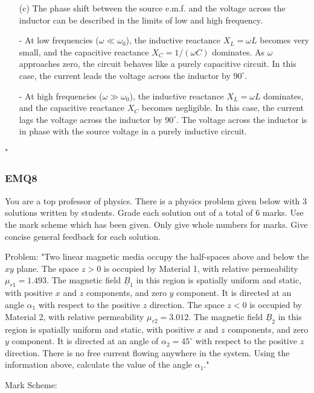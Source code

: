 \begin{enumerate}
    \item[(c)] The phase shift between the source e.m.f. and the voltage across the inductor can be described in the limits of low and high frequency.

    - At low frequencies ($\omega \ll \omega_0$), the inductive reactance $X_L = \omega L$ becomes very small, and the capacitive reactance $X_C = 1/(\omega C)$ dominates. As $\omega$ approaches zero, the circuit behaves like a purely capacitive circuit. In this case, the current leads the voltage across the inductor by $90^\circ$.
    
    - At high frequencies ($\omega \gg \omega_0$), the inductive reactance $X_L = \omega L$ dominates, and the capacitive reactance $X_C$ becomes negligible. In this case, the current lags the voltage across the inductor by $90^\circ$. The voltage across the inductor is in phase with the source voltage in a purely inductive circuit.
\end{enumerate}"

\subsubsection{EMQ8}

You are a top professor of physics. There is a physics problem given below with 3 solutions written by students. Grade each solution out of a total of 6 marks. Use the mark scheme which has been given. Only give whole numbers for marks. Give concise general feedback for each solution. 

Problem:
"Two linear magnetic media occupy the half-spaces above and below the \( xy \) plane. The space \( z > 0 \) is occupied by Material 1, with relative permeability \( \mu_{r1} = 1.493 \). The magnetic field \( \underline{B}_{1} \) in this region is spatially uniform and static, with positive \( x \) and \( z \) components, and zero \( y \) component. It is directed at an angle \( \alpha_{1} \) with respect to the positive \( z \) direction. The space \( z < 0 \) is occupied by Material 2, with relative permeability \( \mu_{r2}= 3.012 \). The magnetic field \( \underline{B}_{2} \) in this region is spatially uniform and static, with positive \( x \) and \( z \) components, and zero \( y \) component. It is directed at an angle of \( \alpha_{2} = 45^\circ \) with respect to the positive \( z \) direction. There is no free current flowing anywhere in the system. Using the information above, calculate the value of the angle \( \alpha_{1} \)."

Mark Scheme:


